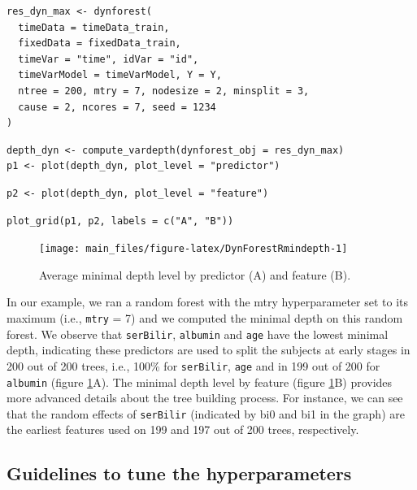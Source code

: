 \begin{verbatim}
res_dyn_max <- dynforest(
  timeData = timeData_train,
  fixedData = fixedData_train,
  timeVar = "time", idVar = "id",
  timeVarModel = timeVarModel, Y = Y,
  ntree = 200, mtry = 7, nodesize = 2, minsplit = 3,
  cause = 2, ncores = 7, seed = 1234
)
\end{verbatim}

\begin{verbatim}
depth_dyn <- compute_vardepth(dynforest_obj = res_dyn_max)
p1 <- plot(depth_dyn, plot_level = "predictor")
\end{verbatim}

\begin{verbatim}
p2 <- plot(depth_dyn, plot_level = "feature")
\end{verbatim}

\begin{verbatim}
plot_grid(p1, p2, labels = c("A", "B"))
\end{verbatim}

\begin{figure}

{\centering \texttt{[image: main\_files/figure-latex/DynForestRmindepth-1]}

}

\caption{Average minimal depth level by predictor (A) and feature (B).}\label{fig:DynForestRmindepth}
\end{figure}

In our example, we ran a random forest with the mtry hyperparameter set to its maximum (i.e., \texttt{mtry} = 7) and we computed the minimal depth on this random forest. We observe that \texttt{serBilir}, \texttt{albumin} and \texttt{age} have the lowest minimal depth, indicating these predictors are used to split the subjects at early stages in 200 out of 200 trees, i.e., 100\% for \texttt{serBilir}, \texttt{age} and in 199 out of 200 for \texttt{albumin} (figure \ref{fig:DynForestRmindepth}A). The minimal depth level by feature (figure \ref{fig:DynForestRmindepth}B) provides more advanced details about the tree building process. For instance, we can see that the random effects of \texttt{serBilir} (indicated by bi0 and bi1 in the graph) are the earliest features used on 199 and 197 out of 200 trees, respectively.

\subsection{Guidelines to tune the hyperparameters}\label{guidelines-to-tune-the-hyperparameters}

